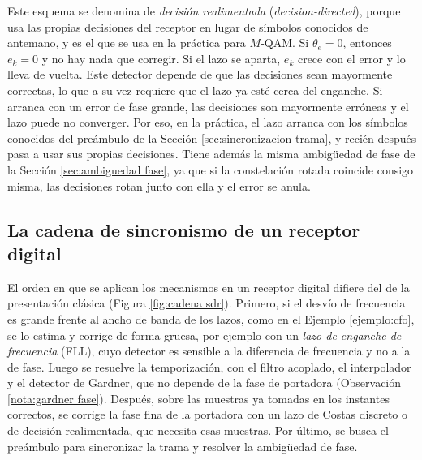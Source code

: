 Este esquema se denomina de \emph{decisión realimentada} (\emph{decision-directed}), porque usa las propias decisiones del receptor en lugar de símbolos conocidos de antemano, y es el que se usa en la práctica para $M$-QAM. Si $\theta_e=0$, entonces $e_k=0$ y no hay nada que corregir. Si el lazo se aparta, $e_k$ crece con el error y lo lleva de vuelta. Este detector depende de que las decisiones sean mayormente correctas, lo que a su vez requiere que el lazo ya esté cerca del enganche. Si arranca con un error de fase grande, las decisiones son mayormente erróneas y el lazo puede no converger. Por eso, en la práctica, el lazo arranca con los símbolos conocidos del preámbulo de la Sección \ref{sec:sincronizacion trama}, y recién después pasa a usar sus propias decisiones. Tiene además la misma ambigüedad de fase de la Sección \ref{sec:ambiguedad fase}, ya que si la constelación rotada coincide consigo misma, las decisiones rotan junto con ella y el error se anula.

\subsection{La cadena de sincronismo de un receptor digital}\label{sec:cadena sdr}

El orden en que se aplican los mecanismos en un receptor digital difiere del de la presentación clásica (Figura \ref{fig:cadena sdr}). Primero, si el desvío de frecuencia es grande frente al ancho de banda de los lazos, como en el Ejemplo \ref{ejemplo:cfo}, se lo estima y corrige de forma gruesa, por ejemplo con un \emph{lazo de enganche de frecuencia} (FLL), cuyo detector es sensible a la diferencia de frecuencia y no a la de fase. Luego se resuelve la temporización, con el filtro acoplado, el interpolador y el detector de Gardner, que no depende de la fase de portadora (Observación \ref{nota:gardner fase}). Después, sobre las muestras ya tomadas en los instantes correctos, se corrige la fase fina de la portadora con un lazo de Costas discreto o de decisión realimentada, que necesita esas muestras. Por último, se busca el preámbulo para sincronizar la trama y resolver la ambigüedad de fase.

